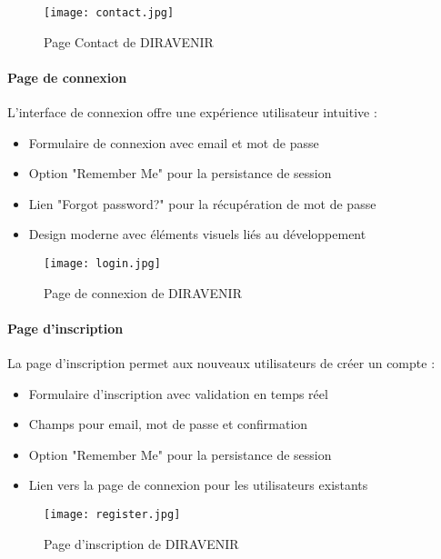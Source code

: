 \documentclass[12pt,a4paper]{report}
\begin{document}
\begin{figure}[H]
\centering
\texttt{[image: contact.jpg]}
\caption{Page Contact de DIRAVENIR}
\label{fig:contact-page}
\end{figure}

\paragraph{Page de connexion}

L'interface de connexion offre une expérience utilisateur intuitive :

\begin{itemize}
    \item Formulaire de connexion avec email et mot de passe
    \item Option "Remember Me" pour la persistance de session
    \item Lien "Forgot password?" pour la récupération de mot de passe
    \item Design moderne avec éléments visuels liés au développement
\end{itemize}

\begin{figure}[H]
\centering
\texttt{[image: login.jpg]}
\caption{Page de connexion de DIRAVENIR}
\label{fig:login-page}
\end{figure}

\paragraph{Page d'inscription}

La page d'inscription permet aux nouveaux utilisateurs de créer un compte :

\begin{itemize}
    \item Formulaire d'inscription avec validation en temps réel
    \item Champs pour email, mot de passe et confirmation
    \item Option "Remember Me" pour la persistance de session
    \item Lien vers la page de connexion pour les utilisateurs existants
\end{itemize}

\begin{figure}[H]
\centering
\texttt{[image: register.jpg]}
\caption{Page d'inscription de DIRAVENIR}
\label{fig:register-page}
\end{figure}
\end{document}
